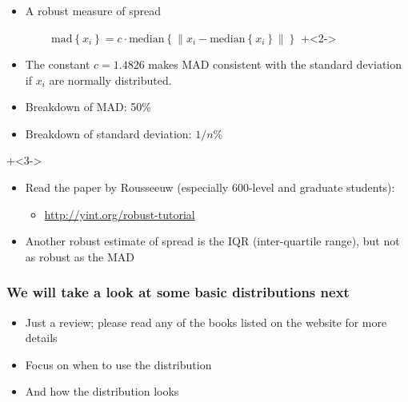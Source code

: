 \begin{frame}\frametitle{{}}
	
	\begin{itemize}
		\item	A robust measure of spread
	\end{itemize}
	$ \qquad\qquad \text{mad}\left\{ x_i \right\} = c \cdot \text{median}\left\{ \| x_i - \text{median}\left\{ x_i \right\} \| \right\} $
	\onslide+<2->{
		\begin{itemize}
			\item	The constant $c = 1.4826$ makes MAD consistent with the standard deviation if $x_i$ are normally distributed.
			\item	Breakdown of MAD: 50\%
			\item	Breakdown of standard deviation: $1/n$\%
		\end{itemize}
	}
	\onslide+<3->{
	\begin{itemize}
		\item	Read the paper by Rousseeuw {\scriptsize (especially 600-level and graduate students)}:
		
			\begin{itemize}
				\item	\href{http://yint.org/robust-tutorial}{http://yint.org/robust-tutorial}
			\end{itemize}

		\end{itemize}
	
		\begin{itemize}
			\item	Another robust estimate of spread is the IQR (inter-quartile range), but not as robust as the MAD
		\end{itemize}
	}
\end{frame}

\begin{frame}\frametitle{We will take a look at some basic distributions next}
	\begin{itemize}
		\item	Just a review; please read any of the books listed on the website for more details
		\item	Focus on when to use the distribution
		\item	And how the distribution looks
	\end{itemize}
\end{frame}

